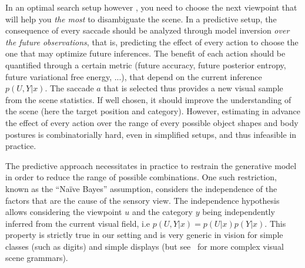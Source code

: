 In an optimal search setup however \cite{Najemnik05}, you need to choose the next viewpoint that will help you \emph{the most} to disambiguate the scene.
In a predictive setup, the consequence of every saccade should be analyzed through model inversion \emph{over the future observations}, that is, predicting the effect of every action to choose the one that may optimize future inferences. The benefit of each action should be quantified through a certain metric (future accuracy, future posterior entropy, future variational free energy, ...), that depend on the current inference $p(U,Y|x)$. The saccade $a$ that is selected thus provides a new visual sample from the scene statistics. If well chosen, it should improve the understanding of the scene (here the target position and category). However, estimating in advance the effect of every action over the range of every possible object shapes and body postures is combinatorially hard, even in simplified setups, and thus infeasible in practice.

The predictive approach necessitates in practice to restrain the generative model in order to reduce the range of possible combinations. One such restriction, known as the ``Naïve Bayes'' assumption, considers the independence of the factors that are the cause of the sensory view.
The independence hypothesis allows considering the viewpoint $u$ and the category $y$ being independently inferred from the current visual field, i.e $p(U,Y|x) = p(U|x) p(Y|x)$. This property is strictly true in our setting and is very generic in vision for simple classes (such as digits) and simple displays (but see~\cite{Vo12} for more complex visual scene grammars).
%


